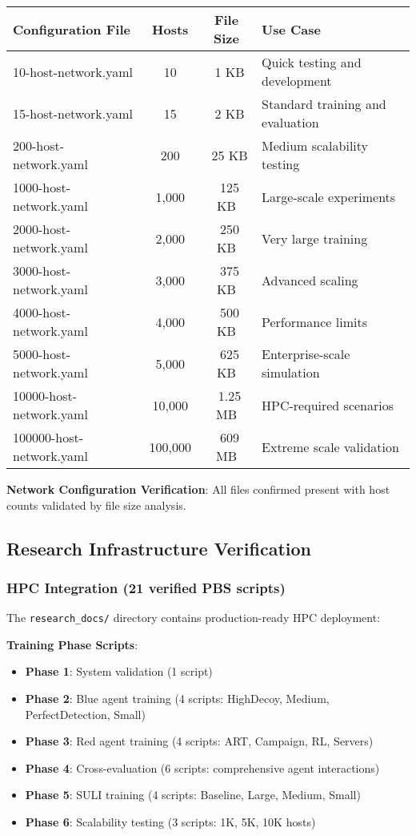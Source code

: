 \documentclass[12pt,a4paper]{article}
\begin{document}
\begin{center}
\begin{longtable}{|l|c|c|l|}
\hline
\textbf{Configuration File} & \textbf{Hosts} & \textbf{File Size} & \textbf{Use Case} \\
\hline
10-host-network.yaml & 10 & ~1 KB & Quick testing and development \\
15-host-network.yaml & 15 & ~2 KB & Standard training and evaluation \\
200-host-network.yaml & 200 & ~25 KB & Medium scalability testing \\
1000-host-network.yaml & 1,000 & ~125 KB & Large-scale experiments \\
2000-host-network.yaml & 2,000 & ~250 KB & Very large training \\
3000-host-network.yaml & 3,000 & ~375 KB & Advanced scaling \\
4000-host-network.yaml & 4,000 & ~500 KB & Performance limits \\
5000-host-network.yaml & 5,000 & ~625 KB & Enterprise-scale simulation \\
10000-host-network.yaml & 10,000 & ~1.25 MB & HPC-required scenarios \\
100000-host-network.yaml & 100,000 & ~609 MB & Extreme scale validation \\
\hline
\end{longtable}
\end{center}

\textbf{Network Configuration Verification}: All files confirmed present with host counts validated by file size analysis.

\subsection{Research Infrastructure Verification}

\subsubsection{HPC Integration (21 verified PBS scripts)}
The \texttt{research\_docs/} directory contains production-ready HPC deployment:

\textbf{Training Phase Scripts}:
\begin{itemize}
    \item \textbf{Phase 1}: System validation (1 script)
    \item \textbf{Phase 2}: Blue agent training (4 scripts: HighDecoy, Medium, PerfectDetection, Small)
    \item \textbf{Phase 3}: Red agent training (4 scripts: ART, Campaign, RL, Servers)
    \item \textbf{Phase 4}: Cross-evaluation (6 scripts: comprehensive agent interactions)
    \item \textbf{Phase 5}: SULI training (4 scripts: Baseline, Large, Medium, Small)
    \item \textbf{Phase 6}: Scalability testing (3 scripts: 1K, 5K, 10K hosts)
\end{itemize}
\end{document}

